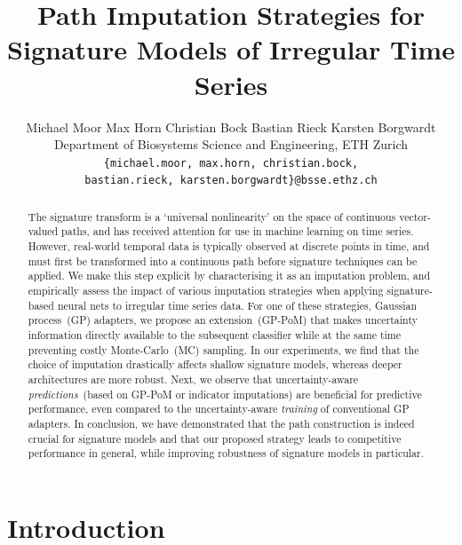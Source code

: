 \documentclass{article}
\title{Path Imputation Strategies for Signature Models of Irregular Time Series}
\author{
    Michael Moor
    \And
	Max Horn
	\And
	Christian Bock
	\And
	Bastian Rieck
	\And
	Karsten Borgwardt
	\AND \\[-12pt]
	Department of Biosystems Science and Engineering, ETH Zurich
	\\
	\hspace{-6.5em}\texttt{\{michael.moor, max.horn, christian.bock,}
	\\
	\hspace{6.5em}\texttt{bastian.rieck, karsten.borgwardt\}@\hspace{0.1pt}bsse.ethz.ch}
} %
\begin{document}
\maketitle

\begin{abstract}
The signature transform is a `universal nonlinearity' on the space of
continuous vector-valued paths, and has received attention for use in
machine learning on time series. However, real-world temporal data is typically observed at discrete points in time, and must first be transformed into a continuous path before
signature techniques can be applied. We make this step explicit by characterising it as an imputation
problem, and empirically assess the impact of various imputation strategies when
applying signature-based neural nets to irregular time series data. For one of these
strategies, Gaussian process~(GP) adapters, we propose an
extension~(GP-PoM) that makes uncertainty information directly available
to the subsequent classifier while at the same time preventing costly
Monte-Carlo~(MC) sampling. In our experiments, we find that the choice
of imputation  drastically affects shallow signature models, whereas
deeper architectures are more robust. Next, we observe that
uncertainty-aware \emph{predictions}~(based on GP-PoM or indicator
imputations) are beneficial for predictive performance, even compared to
the uncertainty-aware \emph{training} of conventional GP adapters.
In conclusion, we have demonstrated that the path construction is indeed
crucial for signature models and that our proposed strategy leads to
competitive performance in general, while improving robustness of
signature models in particular.
\end{abstract} %

\section{Introduction}
\end{document}

